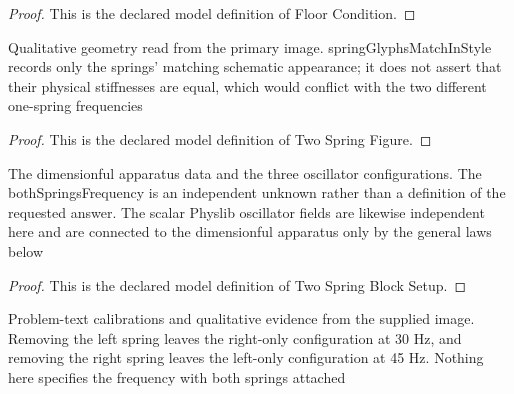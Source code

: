 \begin{proof}
  This is the declared model definition of Floor Condition.
\end{proof}
\begin{definition}
  \label{def:physics:phyx-mini-0252:phyxminiproblems-problemphyxmini0252-twospringfigure}
  Qualitative geometry read from the primary image. springGlyphsMatchInStyle records only the springs' matching schematic appearance; it does not assert that their physical stiffnesses are equal, which would conflict with the two different one-spring frequencies
\end{definition}
\begin{proof}
  This is the declared model definition of Two Spring Figure.
\end{proof}
\begin{definition}
  \label{def:physics:phyx-mini-0252:phyxminiproblems-problemphyxmini0252-twospringblocksetup}
  The dimensionful apparatus data and the three oscillator configurations. The bothSpringsFrequency is an independent unknown rather than a definition of the requested answer. The scalar Physlib oscillator fields are likewise independent here and are connected to the dimensionful apparatus only by the general laws below
\end{definition}
\begin{proof}
  This is the declared model definition of Two Spring Block Setup.
\end{proof}
\begin{definition}
  \label{def:physics:phyx-mini-0252:phyxminiproblems-problemphyxmini0252-matchesproblemandfigure}
  Problem-text calibrations and qualitative evidence from the supplied image. Removing the left spring leaves the right-only configuration at 30 Hz, and removing the right spring leaves the left-only configuration at 45 Hz. Nothing here specifies the frequency with both springs attached
\end{definition}
